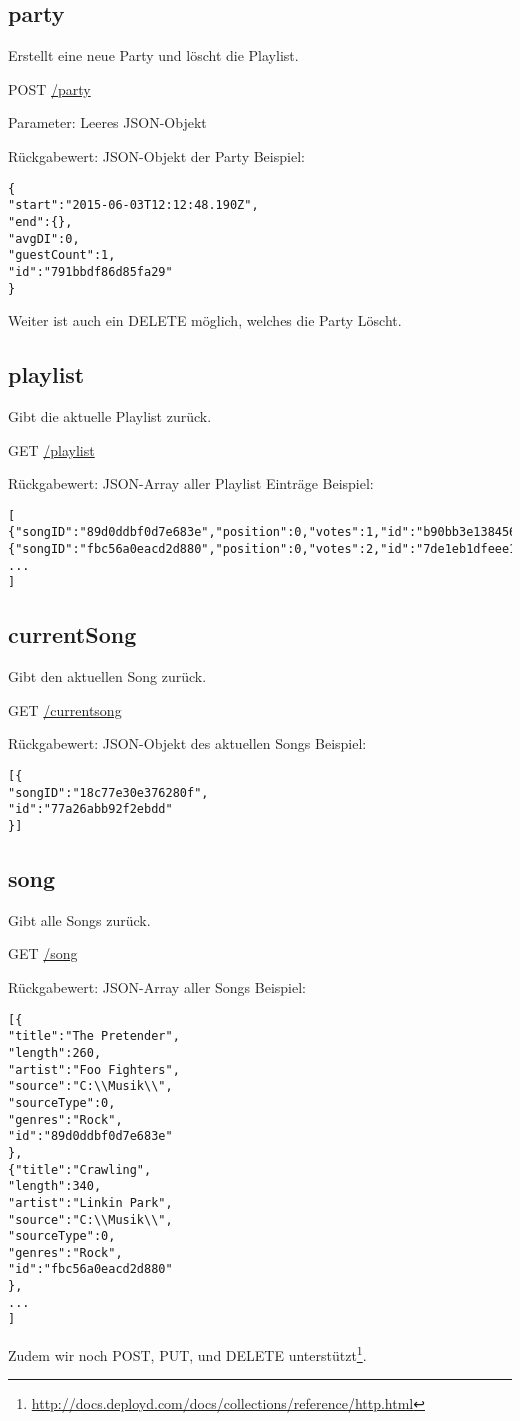 \subsection{party}
\label{service:party}
Erstellt eine neue Party und löscht die Playlist.

POST
\url{/party}

Parameter: Leeres JSON-Objekt

Rückgabewert: JSON-Objekt der Party
Beispiel:
\begin{lstlisting}
{
"start":"2015-06-03T12:12:48.190Z",
"end":{},
"avgDI":0,
"guestCount":1,
"id":"791bbdf86d85fa29"
}
\end{lstlisting}
Weiter ist auch ein DELETE möglich, welches die Party Löscht.

\subsection{playlist}
\label{service:playlist}
Gibt die aktuelle Playlist zurück.

GET
\url{/playlist}

Rückgabewert: JSON-Array aller Playlist Einträge
Beispiel:
\begin{lstlisting}
[
{"songID":"89d0ddbf0d7e683e","position":0,"votes":1,"id":"b90bb3e138456920"},
{"songID":"fbc56a0eacd2d880","position":0,"votes":2,"id":"7de1eb1dfeee188e"},
...
]
\end{lstlisting}


\subsection{currentSong}
\label{service:currentSong}
Gibt den aktuellen Song zurück.

GET
\url{/currentsong}

Rückgabewert: JSON-Objekt des aktuellen Songs
Beispiel:
\begin{lstlisting}
[{
"songID":"18c77e30e376280f",
"id":"77a26abb92f2ebdd"
}]
\end{lstlisting}

\subsection{song}
\label{service:song}
Gibt alle Songs zurück.

GET
\url{/song}

Rückgabewert: JSON-Array aller Songs
Beispiel:
\begin{lstlisting}
[{
"title":"The Pretender",
"length":260,
"artist":"Foo Fighters",
"source":"C:\\Musik\\",
"sourceType":0,
"genres":"Rock",
"id":"89d0ddbf0d7e683e"
},
{"title":"Crawling",
"length":340,
"artist":"Linkin Park",
"source":"C:\\Musik\\",
"sourceType":0,
"genres":"Rock",
"id":"fbc56a0eacd2d880"
},
...
]
\end{lstlisting}



Zudem wir noch POST, PUT, und DELETE unterstützt\footnote{\url{http://docs.deployd.com/docs/collections/reference/http.html}}.


